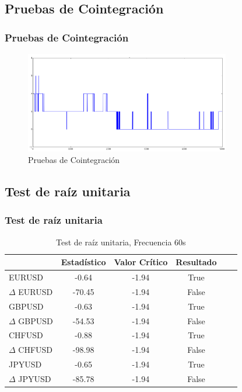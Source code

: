 \documentclass{beamer}
\begin{document}
        \subsection{Pruebas de Cointegración}
            \begin{frame}
            \frametitle{Pruebas de Cointegración}
            \begin{figure}[h!t]
                \begin{center}
                    \includegraphics[width=0.8\textwidth]{img/betas}
                    \caption{Pruebas de Cointegración}
                    \label{fig:cointegracion}
                \end{center}
            \end{figure}

            \end{frame}
        \subsection{Test de raíz unitaria}
            \begin{frame}
            \frametitle{Test de raíz unitaria}
            \begin{table}[h!]
            \caption{Test de raíz unitaria, Frecuencia 60s}
            \label{tab:adf_60s}
            \begin{center}
            \begin{tabular}{|l|c|c|c|c|c|}
            \hline
            & \textbf{Estadístico} & \textbf{Valor Crítico} & \textbf{Resultado}\\
            \hline
            EURUSD          & -0.64 & -1.94 & True       \\
            $\Delta$ EURUSD & -70.45   & -1.94 & False       \\
            GBPUSD          & -0.63   & -1.94 & True          \\
            $\Delta$ GBPUSD & -54.53   & -1.94 & False       \\
            CHFUSD          & -0.88   & -1.94 & True         \\
            $\Delta$ CHFUSD & -98.98   & -1.94 & False       \\
            JPYUSD          & -0.65 & -1.94 & True        \\
            $\Delta$ JPYUSD & -85.78 & -1.94 & False     \\
            \hline
            \end{tabular}
            \end{center}
            \end{table}

            \end{frame}
\end{document}
